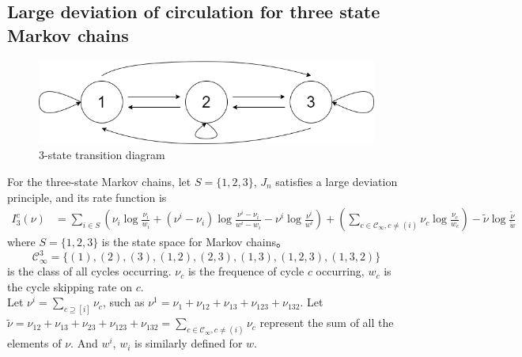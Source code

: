 \documentclass[11pt,en,cite=authoryear]{elegantpaper}
\begin{document}
\subsection{Large deviation of circulation for three state Markov chains}

\begin{theorem}
    \begin{figure}[h]
        \centering
        \includegraphics[scale=0.3]{chart/3-state.png}
        \caption{3-state transition diagram}
    \end{figure}

For the three-state Markov chains, let $S = \{1, 2, 3\}$, $J_{n}$ satisfies a large deviation principle, and its rate function is
\begin{align*}
    I_3^c(\nu) &=
    \sum_{i\in S} \left(\nu_{i}\log \frac{\nu_{i}}{w_i} + (\nu^i - \nu_i)\log \frac{\nu^i - \nu_i}{w^i - w_i} 
    - \nu^i \log \frac{\nu^i}{w^i} \right)
    + \left(\sum_{c \in \mathcal{C}_{\infty}, c\neq (i)} \nu_{c} \log \frac{\nu_{c}}{w_c} \right)
    -\tilde{\nu}\log \frac{\tilde{\nu} }{\tilde{w} }
\end{align*}
where $S=\{1, 2, 3\}$ is the state space for Markov chains。
$$\mathcal{C}_{\infty}^3 = \{(1), (2), (3), (1,2), (2,3), (1,3), (1,2,3), (1,3,2)\}$$
is the class of all cycles occurring.
$\nu_c$ is the frequence of cycle $c$ occurring, $w_c$ is the cycle skipping rate on $c$.\\
Let $\nu^{i} = \sum_{c \supseteq [i]} \nu_{c}$, such as $\nu^{1} = \nu_{1} + \nu_{12} + \nu_{13} + \nu_{123} +\nu_{132}$.
Let  $\tilde{\nu} = \nu_{12} + \nu_{13} + \nu_{23} + \nu_{123} +\nu_{132}=\sum_{c \in \mathcal{C}_{\infty}, c\neq (i)} \nu_{c}$ represent the sum of all the elements of $\nu$. 
And $w^i$, $w_i$ is similarly defined for $w$.
\end{theorem}
\end{document}
